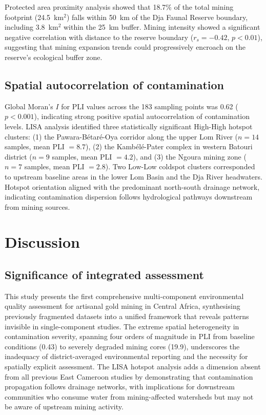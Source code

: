 \documentclass[preprint,12pt,number]{elsarticle}
\begin{document}
Protected area proximity analysis showed that 18.7\% of the total mining footprint (24.5~km$^{2}$) falls within 50~km of the Dja Faunal Reserve boundary, including 3.8~km$^{2}$ within the 25~km buffer. Mining intensity showed a significant negative correlation with distance to the reserve boundary ($r_s = -0.42$, $p < 0.01$), suggesting that mining expansion trends could progressively encroach on the reserve's ecological buffer zone.


\subsection{Spatial autocorrelation of contamination}

Global Moran's $I$ for PLI values across the 183 sampling points was 0.62 ($p < 0.001$), indicating strong positive spatial autocorrelation of contamination levels. LISA analysis identified three statistically significant High-High hotspot clusters: (1) the Pawara-B\'{e}tar\'{e}-Oya corridor along the upper Lom River ($n = 14$ samples, mean PLI $= 8.7$), (2) the Kamb\'{e}l\'{e}-Pater complex in western Batouri district ($n = 9$ samples, mean PLI $= 4.2$), and (3) the Ngoura mining zone ($n = 7$ samples, mean PLI $= 2.8$). Two Low-Low coldspot clusters corresponded to upstream baseline areas in the lower Lom Basin and the Dja River headwaters. Hotspot orientation aligned with the predominant north-south drainage network, indicating contamination dispersion follows hydrological pathways downstream from mining sources.


\section{Discussion}

\subsection{Significance of integrated assessment}

This study presents the first comprehensive multi-component environmental quality assessment for artisanal gold mining in Central Africa, synthesising previously fragmented datasets into a unified framework that reveals patterns invisible in single-component studies. The extreme spatial heterogeneity in contamination severity, spanning four orders of magnitude in PLI from baseline conditions (0.43) to severely degraded mining cores (19.9), underscores the inadequacy of district-averaged environmental reporting and the necessity for spatially explicit assessment. The LISA hotspot analysis adds a dimension absent from all previous East Cameroon studies by demonstrating that contamination propagation follows drainage networks, with implications for downstream communities who consume water from mining-affected watersheds but may not be aware of upstream mining activity.
\end{document}
